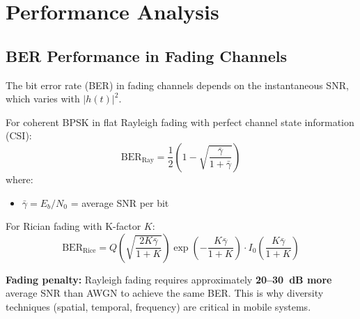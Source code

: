 \begin{Shaded}
\begin{Highlighting}[]
\OperatorTok{=}
\OperatorTok{=}

\OperatorTok{=}\OperatorTok{{-}}\OperatorTok{**}\NormalTok{)}
\NormalTok{(}\SpecialCharTok{\{}\OperatorTok{*}\NormalTok{)}
\end{Highlighting}
\end{Shaded}

\section{Performance Analysis}

\subsection{BER Performance in Fading Channels}

The bit error rate (BER) in fading channels depends on the instantaneous SNR, which varies with $|h(t)|^2$.

For coherent BPSK in flat Rayleigh fading with perfect channel state information (CSI):
\begin{equation}
\mathrm{BER}_{\text{Ray}} = \frac{1}{2}\left(1 - \sqrt{\frac{\bar{\gamma}}{1 + \bar{\gamma}}}\right)
\end{equation}
where:
\begin{itemize}
\item $\bar{\gamma} = E_b/N_0$ = average SNR per bit
\end{itemize}

For Rician fading with K-factor $K$:
\begin{equation}
\mathrm{BER}_{\text{Rice}} = Q\left(\sqrt{\frac{2K\bar{\gamma}}{1+K}}\right) \exp\left(-\frac{K\bar{\gamma}}{1+K}\right) \cdot I_0\left(\frac{K\bar{\gamma}}{1+K}\right)
\end{equation}

\begin{keyconcept}
\textbf{Fading penalty:} Rayleigh fading requires approximately \textbf{20--30~dB more} average SNR than AWGN to achieve the same BER. This is why diversity techniques (spatial, temporal, frequency) are critical in mobile systems.
\end{keyconcept}

